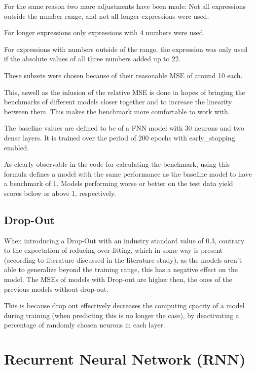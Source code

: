 \documentclass{article}
\begin{document}
For the same reason two more adjustments have been made:
Not all expressions outside the number range, and not all longer expressions 
were used. 

For longer expressions only expressions with 4 numbers were used.

For expressions with numbers outside of the range, the expression was only 
used if the absolute values of all three numbers added up to 22.

These subsets were chosen because of their reasonable MSE of around 10 each.

This, aswell as the inlusion of the relative MSE is done in hopes of 
bringing the benchmarks of different models closer together and to increase 
the linearity between them. This makes the benchmark more comfortable to 
work with.

The baseline values are defined to be of a FNN model with 30 neurons and two 
dense layers. It is trained over the period of 200 epochs with 
early\_stopping enabled.

As clearly observable in the code for calculating the benchmark, using this 
formula defines a model with the same performance as the baseline model to 
have a benchmark of 1. Models performing worse or better on the test data 
yield scores below or above 1, respectively.


\subsection{Drop-Out}
When introducing a Drop-Out with an industry standard value of 0.3, contrary 
to the expectation of reducing over-fitting, which in some way is present 
(according to literature discussed in the literature study), as the models 
aren't able to generalize beyond the training range, this has a negative 
effect on the model. The MSEs of models with Drop-out are higher then, the 
ones of the previous models without drop-out. 

This is because drop out effectively decreases the computing cpacity of a 
model during training (when predicting this is no longer the case), by 
deactivating a percentage of randomly chosen neurons in each layer.

\section{Recurrent Neural Network (RNN)}
\end{document}
